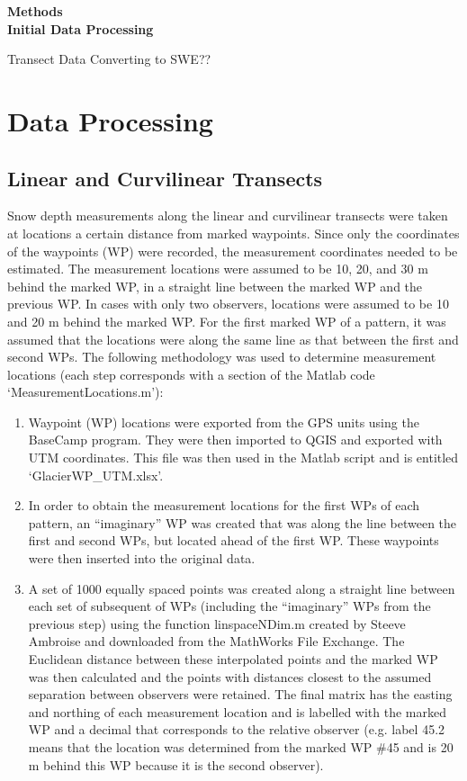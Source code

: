 \documentclass[12pt]{article}
\begin{document}

\begin{center}
\Large \textbf{Methods\\ Initial Data Processing}
\end{center}


Transect Data
	Converting to SWE??



\section{Data Processing}

\subsection{Linear and Curvilinear Transects}

Snow depth measurements along the linear and curvilinear transects were taken at locations a certain distance from marked waypoints. Since only the coordinates of the waypoints (WP) were recorded, the measurement coordinates needed to be estimated. The measurement locations were assumed to be 10, 20, and 30 m behind the marked WP, in a straight line between the marked WP and the previous WP. In cases with only two observers, locations were assumed to be 10 and 20 m behind the marked WP. For the first marked WP of a pattern, it was assumed that the locations were along the same line as that between the first and second WPs. The following methodology was used to determine measurement locations (each step corresponds with a section of the Matlab code `MeasurementLocations.m'): 
\begin{enumerate}
\item Waypoint (WP) locations were exported from the GPS units using the BaseCamp program. They were then imported to QGIS and exported with UTM coordinates. This file was then used in the Matlab script and is entitled `GlacierWP\_UTM.xlsx'. 
\item In order to obtain the measurement locations for the first WPs of each pattern, an ``imaginary'' WP was created that was along the line between the first and second WPs, but located ahead of the first WP. These waypoints were then inserted into the original data. 
\item A set of 1000 equally spaced points was created along a straight line between each set of subsequent of WPs (including the ``imaginary'' WPs from the previous step) using the function linspaceNDim.m created by Steeve Ambroise and downloaded from the MathWorks File Exchange. The Euclidean distance between these interpolated points and the marked WP was then calculated and the points with distances closest to the assumed separation between observers were retained. The final matrix has the easting and northing of each measurement location and is labelled with the marked WP and a decimal that corresponds to the relative observer (e.g. label 45.2 means that the location was determined from the marked WP \#45 and is 20 m behind this WP because it is the second observer). 
\end{enumerate}
\end{document}
